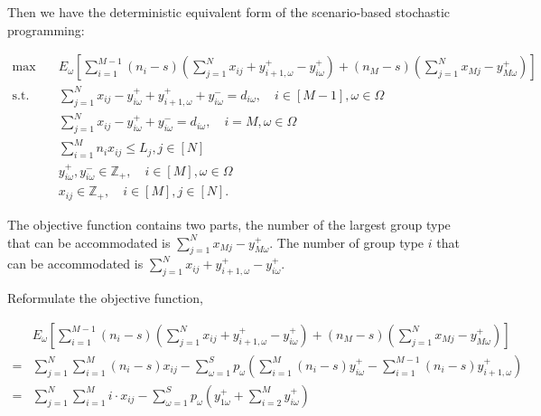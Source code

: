 


Then we have the deterministic equivalent form of the scenario-based stochastic programming:

\begin{equation}\label{sto_form}
    \begin{aligned}
    \max \quad & E_{\omega}\left[\sum_{i=1}^{M-1} (n_i-s) (\sum_{j= 1}^{N} x_{ij} + y_{i+1,\omega}^{+} - y_{i \omega}^{+}) + (n_{M}-s) (\sum_{j= 1}^{N} x_{Mj} - y_{M \omega}^{+})\right] \\
    \text {s.t.} \quad & \sum_{j= 1}^{N} x_{ij}-y_{i \omega}^{+}+
    y_{i+1, \omega}^{+} + y_{i \omega}^{-}=d_{i \omega}, \quad i \in [M-1], \omega \in \Omega \\
    & \sum_{j= 1}^{N} x_{ij} -y_{i \omega}^{+}+y_{i \omega}^{-}=d_{i \omega}, \quad i = M, \omega \in \Omega \\
    & \sum_{i=1}^{M} n_{i} x_{ij} \leq L_j, j \in [N]\\
    & y_{i \omega}^{+}, y_{i \omega}^{-} \in \mathbb{Z}_{+}, \quad i \in [M], \omega \in \Omega \\
    & x_{ij} \in \mathbb{Z}_{+}, \quad i \in [M], j \in [N].
    \end{aligned}
  \end{equation}


The objective function contains two parts, the number of the largest group type that can be accommodated is $\sum_{j= 1}^{N} x_{Mj} - y_{M \omega}^{+}$. The number of group type $i$ that can be accommodated is $\sum_{j= 1}^{N} x_{ij} + y_{i+1,\omega}^{+} - y_{i \omega}^{+}$.


Reformulate the objective function,

\begin{align*}
  & E_{\omega}\left[\sum_{i=1}^{M-1} (n_i-s) (\sum_{j= 1}^{N} x_{ij} + y_{i+1,\omega}^{+} - y_{i \omega}^{+}) + (n_M-s) (\sum_{j= 1}^{N} x_{Mj} - y_{M \omega}^{+})\right] \\
  =& \sum_{j =1}^{N} \sum_{i=1}^M (n_i-s) x_{ij} - \sum_{\omega =1}^{S} p_{\omega} \left(\sum_{i=1}^{M}(n_i-s)y_{i \omega}^{+} - \sum_{i=1}^{M-1}(n_i-s)y_{i+1, \omega}^{+}\right) \\
  =& \sum_{j =1}^{N} \sum_{i=1}^M i \cdot x_{ij} - \sum_{\omega =1}^{S} p_{\omega} \left( y_{1 \omega}^{+} + \sum_{i=2}^{M} y_{i \omega}^{+} \right)
\end{align*}


